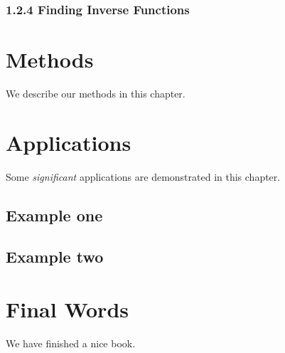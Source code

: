 \documentclass[
]{book}
\begin{document}
\hypertarget{finding-inverse-functions}{%
\subsection{1.2.4 Finding Inverse Functions}\label{finding-inverse-functions}}

\hypertarget{methods}{%
\chapter{Methods}\label{methods}}

We describe our methods in this chapter.

\hypertarget{applications}{%
\chapter{Applications}\label{applications}}

Some \emph{significant} applications are demonstrated in this chapter.

\hypertarget{example-one}{%
\section{Example one}\label{example-one}}

\hypertarget{example-two}{%
\section{Example two}\label{example-two}}

\hypertarget{final-words}{%
\chapter{Final Words}\label{final-words}}

We have finished a nice book.

  
\end{document}
